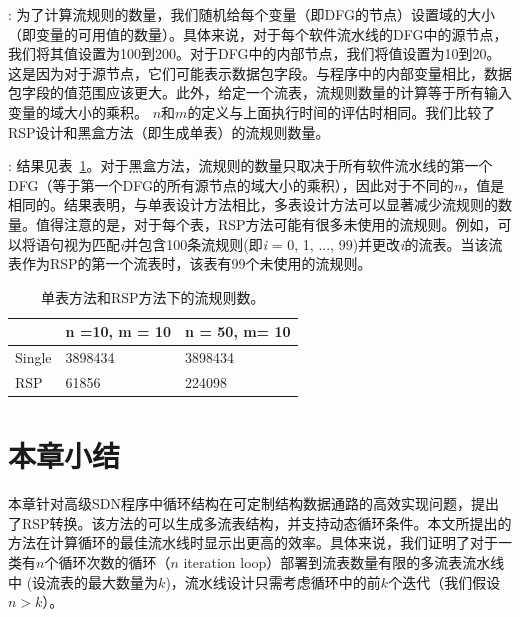 : 为了计算流规则的数量，我们随机给每个变量（即DFG的节点）设置域的大小（即变量的可用值的数量）。具体来说，对于每个软件流水线的DFG中的源节点，我们将其值设置为100到200。对于DFG中的内部节点，我们将值设置为10到20。这是因为对于源节点，它们可能表示数据包字段。与程序中的内部变量相比，数据包字段的值范围应该更大。此外，给定一个流表，流规则数量的计算等于所有输入变量的域大小的乘积。
$n$和$m$的定义与上面执行时间的评估时相同。我们比较了RSP设计和黑盒方法（即生成单表）的流规则数量。

: 结果见表~\ref{table:eval2}。对于黑盒方法，流规则的数量只取决于所有软件流水线的第一个DFG（等于第一个DFG的所有源节点的域大小的乘积），因此对于不同的$n$，值是相同的。结果表明，与单表设计方法相比，多表设计方法可以显著减少流规则的数量。值得注意的是，对于每个表，RSP方法可能有很多未使用的流规则。例如，可以将语句视为匹配\emph{i}并包含100条流规则(即\emph{i} = 0, 1, ..., 99)并更改\emph{i}的流表。当该流表作为RSP的第一个流表时，该表有99个未使用的流规则。

\begin{table}[!htbp]
\centering
\begin{tabular}{|l|l|l|}
\hline
         & n =10, m = 10 & n = 50, m= 10 \\ \hline
Single  & 3898434       & 3898434       \\ \hline
RSP & 61856         & 224098        \\ \hline
\end{tabular}
\caption{\small 单表方法和RSP方法下的流规则数。}
\label{table:eval2}
\end{table}

\section{本章小结}

本章针对高级SDN程序中循环结构在可定制结构数据通路的高效实现问题，提出了RSP转换。该方法的可以生成多流表结构，并支持动态循环条件。本文所提出的方法在计算循环的最佳流水线时显示出更高的效率。具体来说，我们证明了对于一类有$n$个循环次数的循环（$n$ iteration loop）部署到流表数量有限的多流表流水线中 (设流表的最大数量为$k$)，流水线设计只需考虑循环中的前$k$个迭代（我们假设$n > k$）。

